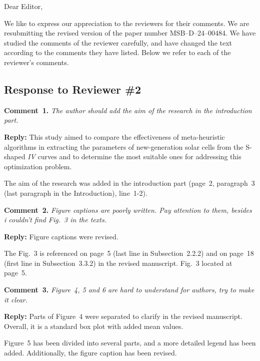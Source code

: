 \documentclass[a4paper,fleqn]{cas-sc}
\begin{document}
\shorttitle{}


Dear Editor,

We like to express our appreciation to the reviewers for their comments.
We are resubmitting the revised version of the paper number MSB--D--24--00484.
We have studied the comments of the reviewer carefully, and have changed the text according to the comments they
have listed.
Below we refer to each of the reviewer’s comments.


\subsection*{Response to Reviewer \#2 }

\noindent
\textcolor[rgb]{0.00,0.50,1.00}{\textbf{Comment~1.}}
\emph{The author should add the aim of the research in the introduction part.}

\noindent
\textcolor[rgb]{0.51,0.00,0.00}{\textbf{Reply:}}
This study aimed to compare the effectiveness of meta-heuristic algorithms in extracting 
the parameters of new-generation solar cells from the S-shaped \emph{IV} curves
and to determine the most suitable ones for addressing this optimization problem.

The aim of the research was added in the introduction part 
(page~2, paragraph~3 (last paragraph in the Introduction), line~1-2).


\vspace{1cm}
\noindent
\textcolor[rgb]{0.00,0.50,1.00}{\textbf{Comment~2.}}
\emph{Figure captions are poorly written. Pay attention to them, besides i couldn't find Fig.~3 in the texts.}

\noindent
\textcolor[rgb]{0.51,0.00,0.00}{\textbf{Reply:}}
Figure captions were revised.

The Fig.~3 is referenced on page~5 (last line in Subsection~2.2.2) and on page~18 (first line in Subsection~3.3.2)
in the revised manuscript.
Fig.~3 located at page~5.


\vspace{1cm}
\noindent
\textcolor[rgb]{0.00,0.50,1.00}{\textbf{Comment~3.}}
\emph{Figure~4, 5 and 6 are hard to understand for authors, try to make it clear.}

\noindent
\textcolor[rgb]{0.51,0.00,0.00}{\textbf{Reply:}}
Parts of Figure~4 were separated to clarify in the revised manuscript.
Overall, it is a standard box plot with added mean values.

Figure~5 has been divided into several parts, and a more detailed legend has been added. 
Additionally, the figure caption has been revised.
\end{document}
